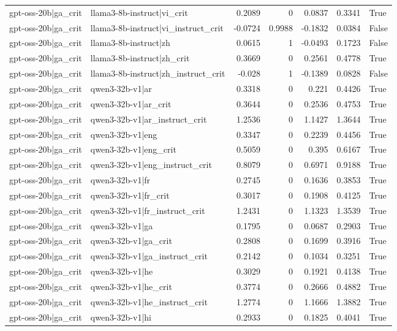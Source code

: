 \begin{table}
\begin{tabular}{l l r r r r l}
gpt-oss-20b|ga_crit & llama3-8b-instruct|vi_crit & 0.2089 & 0 & 0.0837 & 0.3341 & True \\
gpt-oss-20b|ga_crit & llama3-8b-instruct|vi_instruct_crit & -0.0724 & 0.9988 & -0.1832 & 0.0384 & False \\
gpt-oss-20b|ga_crit & llama3-8b-instruct|zh & 0.0615 & 1 & -0.0493 & 0.1723 & False \\
gpt-oss-20b|ga_crit & llama3-8b-instruct|zh_crit & 0.3669 & 0 & 0.2561 & 0.4778 & True \\
gpt-oss-20b|ga_crit & llama3-8b-instruct|zh_instruct_crit & -0.028 & 1 & -0.1389 & 0.0828 & False \\
gpt-oss-20b|ga_crit & qwen3-32b-v1|ar & 0.3318 & 0 & 0.221 & 0.4426 & True \\
gpt-oss-20b|ga_crit & qwen3-32b-v1|ar_crit & 0.3644 & 0 & 0.2536 & 0.4753 & True \\
gpt-oss-20b|ga_crit & qwen3-32b-v1|ar_instruct_crit & 1.2536 & 0 & 1.1427 & 1.3644 & True \\
gpt-oss-20b|ga_crit & qwen3-32b-v1|eng & 0.3347 & 0 & 0.2239 & 0.4456 & True \\
gpt-oss-20b|ga_crit & qwen3-32b-v1|eng_crit & 0.5059 & 0 & 0.395 & 0.6167 & True \\
gpt-oss-20b|ga_crit & qwen3-32b-v1|eng_instruct_crit & 0.8079 & 0 & 0.6971 & 0.9188 & True \\
gpt-oss-20b|ga_crit & qwen3-32b-v1|fr & 0.2745 & 0 & 0.1636 & 0.3853 & True \\
gpt-oss-20b|ga_crit & qwen3-32b-v1|fr_crit & 0.3017 & 0 & 0.1908 & 0.4125 & True \\
gpt-oss-20b|ga_crit & qwen3-32b-v1|fr_instruct_crit & 1.2431 & 0 & 1.1323 & 1.3539 & True \\
gpt-oss-20b|ga_crit & qwen3-32b-v1|ga & 0.1795 & 0 & 0.0687 & 0.2903 & True \\
gpt-oss-20b|ga_crit & qwen3-32b-v1|ga_crit & 0.2808 & 0 & 0.1699 & 0.3916 & True \\
gpt-oss-20b|ga_crit & qwen3-32b-v1|ga_instruct_crit & 0.2142 & 0 & 0.1034 & 0.3251 & True \\
gpt-oss-20b|ga_crit & qwen3-32b-v1|he & 0.3029 & 0 & 0.1921 & 0.4138 & True \\
gpt-oss-20b|ga_crit & qwen3-32b-v1|he_crit & 0.3774 & 0 & 0.2666 & 0.4882 & True \\
gpt-oss-20b|ga_crit & qwen3-32b-v1|he_instruct_crit & 1.2774 & 0 & 1.1666 & 1.3882 & True \\
gpt-oss-20b|ga_crit & qwen3-32b-v1|hi & 0.2933 & 0 & 0.1825 & 0.4041 & True \\

\end{tabular}
\end{table}
